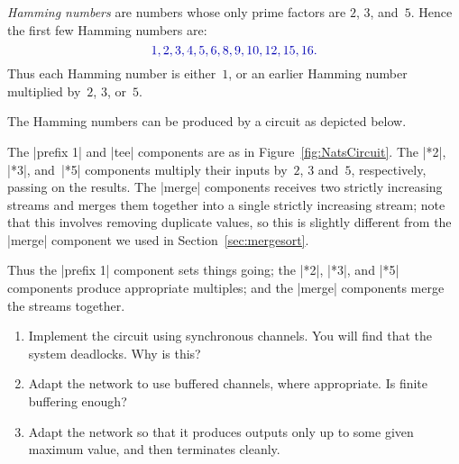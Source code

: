 \begin{question}
\emph{Hamming numbers} are numbers whose only prime factors are $2$, $3$,
and~$5$.  Hence the first few Hamming numbers are:
\[ \mstyle
1, 2, 3, 4, 5, 6, 8, 9, 10, 12, 15, 16.
\]
Thus each Hamming number is either~$1$, or an earlier Hamming number
multiplied by~$2$, $3$, or~$5$.

The Hamming numbers can be produced by a circuit as depicted below.
%
\begin{center}
\end{center}
%
The |prefix 1| and |tee| components are as in Figure~\ref{fig:NatsCircuit}.
The |*2|, |*3|, and~|*5| components multiply their inputs by~$2$, $3$ and~$5$,
respectively, passing on the results.  The |merge| components receives two
strictly increasing streams and merges them together into a single strictly
increasing stream; note that this involves removing duplicate values, so this
is slightly different from the |merge| component we used in
Section~\ref{sec:mergesort}.

Thus the |prefix 1| component sets things going; the |*2|, |*3|, and |*5|
components produce appropriate multiples; and the |merge| components merge the
streams together.

\begin{enumerate}
\item Implement the circuit using synchronous channels.  You will find that
  the system deadlocks.  Why is this?

\item Adapt the network to use buffered channels, where appropriate.  Is finite
  buffering enough?

\item Adapt the network so that it produces outputs only up to some given
  maximum value, and then terminates cleanly.
\end{enumerate}
\end{question}


